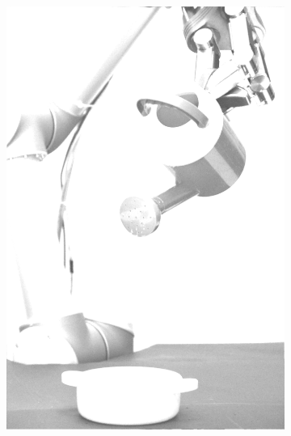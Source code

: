 \begin{figure}[H]
\begin{subfigure}[b]{0.1\textwidth}
        \includegraphics[width=\textwidth]{img3/test/contrast_5_1_7_final_img3.png}
    \end{subfigure}
        \begin{subfigure}[b]{0.1\textwidth}

\end{subfigure}
\end{figure}
